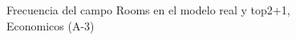\begin{figure}[H]
    \centering
    
    \caption{Frecuencia del campo Rooms en el modelo real y top2+1, Economicos (A-3)}
    \label{frecuency-Rooms-top2+1}
\end{figure}
